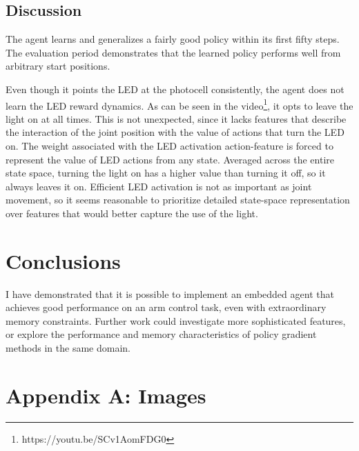 \documentclass{article}
\begin{document}
\subsection{Discussion}

The agent learns and generalizes a fairly good policy within its first fifty steps. The evaluation period demonstrates that the learned policy performs well from arbitrary start positions. 

Even though it points the LED at the photocell consistently, the agent does not learn the LED reward dynamics. As can be seen in the video\footnote{https://youtu.be/SCv1AomFDG0}, it opts to leave the light on at all times. This is not unexpected, since it lacks features that describe the interaction of the joint position with the value of actions that turn the LED on. The weight associated with the LED activation action-feature is forced to represent the value of LED actions from any state. Averaged across the entire state space, turning the light on has a higher value than turning it off, so it always leaves it on. Efficient LED activation is not as important as joint movement, so it seems reasonable to prioritize detailed state-space representation over features that would better capture the use of the light.



\section{Conclusions}

I have demonstrated that it is possible to implement an embedded agent that achieves good performance on an arm control task, even with extraordinary memory constraints. Further work could investigate more sophisticated features, or explore the performance and memory characteristics of policy gradient methods in the same domain.

\clearpage


\section{Appendix A: Images}
\end{document}
